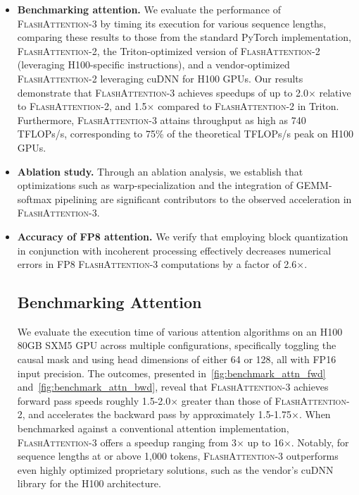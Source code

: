 \begin{enumerate}
\begin{itemize}

\item \textbf{Benchmarking attention.} We evaluate the performance of \textsc{FlashAttention-3} by timing its execution for various sequence lengths, comparing these results to those from the standard PyTorch implementation, \textsc{FlashAttention-2}, the Triton-optimized version of \textsc{FlashAttention-2} (leveraging H100-specific instructions), and a vendor-optimized \textsc{FlashAttention-2} leveraging cuDNN for H100 GPUs. Our results demonstrate that \textsc{FlashAttention-3} achieves speedups of up to 2.0$\times$ relative to \textsc{FlashAttention-2}, and 1.5$\times$ compared to \textsc{FlashAttention-2} in Triton. Furthermore, \textsc{FlashAttention-3} attains throughput as high as 740 TFLOPs/s, corresponding to 75\% of the theoretical TFLOPs/s peak on H100 GPUs.

\item \textbf{Ablation study.} Through an ablation analysis, we establish that optimizations such as warp-specialization and the integration of GEMM-softmax pipelining are significant contributors to the observed acceleration in \textsc{FlashAttention-3}.

\item \textbf{Accuracy of FP8 attention.} We verify that employing block quantization in conjunction with incoherent processing effectively decreases numerical errors in FP8 \textsc{FlashAttention-3} computations by a factor of 2.6$\times$.

\subsection{Benchmarking Attention}
\label{subsec:benchmark_attn}

We evaluate the execution time of various attention algorithms on an H100 80GB SXM5 GPU across multiple configurations, specifically toggling the causal mask and using head dimensions of either 64 or 128, all with FP16 input precision. The outcomes, presented in~\cref{fig:benchmark_attn_fwd} and~\cref{fig:benchmark_attn_bwd}, reveal that \textsc{FlashAttention-3} achieves forward pass speeds roughly 1.5-2.0$\times$ greater than those of \textsc{FlashAttention-2}, and accelerates the backward pass by approximately 1.5-1.75$\times$. When benchmarked against a conventional attention implementation, \textsc{FlashAttention-3} offers a speedup ranging from 3$\times$ up to 16$\times$. Notably, for sequence lengths at or above 1,000 tokens, \textsc{FlashAttention-3} outperforms even highly optimized proprietary solutions, such as the vendor’s cuDNN library for the H100 architecture.


\end{itemize}
\end{enumerate}

